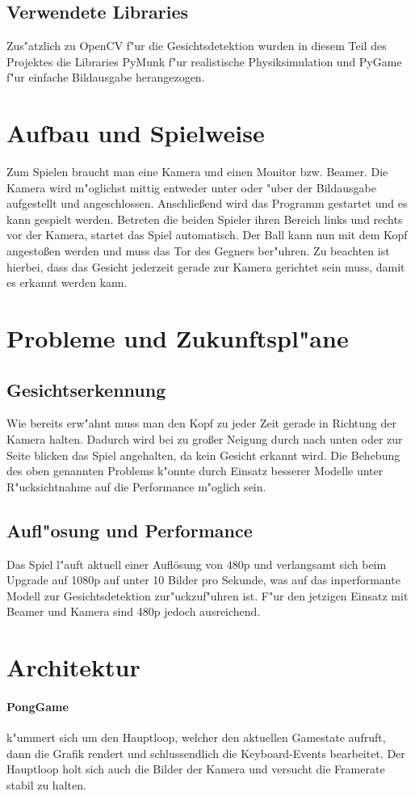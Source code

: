 \documentclass[12pt]{article}
\begin{document}
\subsection{Verwendete Libraries}
Zus"atzlich zu OpenCV f"ur die Gesichtsdetektion wurden in diesem Teil des Projektes
die Libraries PyMunk f"ur realistische Physiksimulation und PyGame f"ur einfache Bildausgabe
herangezogen.
\section{Aufbau und Spielweise}
Zum Spielen braucht man eine Kamera und einen Monitor bzw. Beamer. Die Kamera
wird m"oglichst mittig entweder unter oder "uber der Bildausgabe aufgestellt und angeschlossen.
Anschlie{\ss}end wird das Programm gestartet und es kann gespielt werden.
Betreten die beiden Spieler ihren Bereich links und rechts vor der Kamera,
startet das Spiel automatisch. Der Ball kann nun mit dem Kopf angesto{\ss}en werden
und muss das Tor des Gegners ber"uhren. Zu beachten ist hierbei, dass
das Gesicht jederzeit gerade zur Kamera gerichtet sein muss, damit es erkannt werden kann.
\section{Probleme und Zukunftspl"ane}
\subsection{Gesichtserkennung}
Wie bereits erw"ahnt muss man den Kopf zu jeder Zeit gerade in Richtung
der Kamera halten. Dadurch wird bei zu gro{\ss}er Neigung durch nach unten oder zur
Seite blicken das Spiel angehalten, da kein Gesicht erkannt wird.
Die Behebung des oben genannten Problems k"onnte durch Einsatz besserer
Modelle unter R"ucksichtnahme auf die Performance m"oglich sein.
\subsection{Aufl"osung und Performance}
Das Spiel l"auft aktuell einer Auflösung von 480p und verlangsamt sich beim Upgrade auf 1080p
auf unter 10 Bilder pro Sekunde, was auf das inperformante Modell zur
Gesichtsdetektion zur"uckzuf"uhren ist. F"ur den jetzigen Einsatz mit
Beamer und Kamera sind 480p jedoch ausreichend.
\section{Architektur}
\paragraph{PongGame}
k"ummert sich um den Hauptloop, welcher den aktuellen Gamestate aufruft, dann die 
Grafik rendert und schlussendlich die Keyboard-Events bearbeitet.
Der Hauptloop holt sich auch die Bilder der Kamera und versucht die Framerate 
stabil zu halten.
\end{document}
